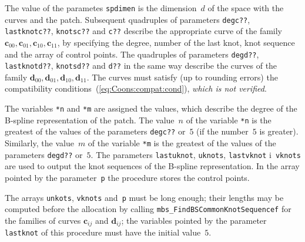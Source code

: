 The value of the parametes \texttt{spdimen} is the dimension~$d$ of the space
with the curves and the patch. Subsequent quadruples of parameters
\texttt{degc??}, \texttt{lastknotc??}, \texttt{knotsc??} and \texttt{c??}
describe the appropriate curve of the family
$\bm{c}_{00},\bm{c}_{01},\bm{c}_{10},\bm{c}_{11}$, by specifying the degree,
number of the last knot, knot sequence and the array of control points.
The quadruples of parameters \texttt{degd??}, \texttt{lastknotd??},
\texttt{knotsd??} and \texttt{d??} in the same way describe the curves
of the family $\bm{d}_{00},\bm{d}_{01},\bm{d}_{10},\bm{d}_{11}$.
The curves must satisfy (up to rounding errors) the compatibility
conditions~(\ref{eq:Coons:compat:cond}), \emph{which is not verified}.

The variables \texttt{*n} and \texttt{*m} are assigned the values, which describe
the degree of the B-spline representation of the patch. The value~$n$ of the
variable \texttt{*n} is the greatest of the values of the parameters
\texttt{degc??} or~$5$ (if the number~$5$ is greater).
Similarly, the value~$m$ of the variable \texttt{*m} is the greatest
of the values of the parameters \texttt{degd??} or~$5$. The parameters
\texttt{lastuknot}, \texttt{uknots}, \texttt{lastvknot} i~\texttt{vknots}
are used to output the knot sequences of the B-spline representation.
In the array pointed by the parameter~\texttt{p} the procedure stores the
control points.

The arrays \texttt{unkots}, \texttt{vknots} and~\texttt{p} must be long enough;
their lengths may be computed before the allocation by calling
\texttt{mbs\_FindBSCommonKnotSequencef} for the families of curves
$\bm{c}_{ij}$ and $\bm{d}_{ij}$; the variables pointed by the parameter
\texttt{lastknot} of this procedure must have the initial value~$5$.


